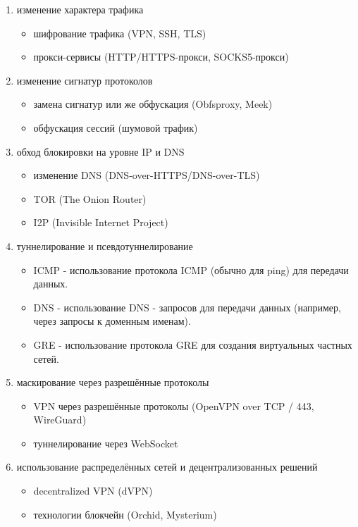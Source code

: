 \documentclass[utf8,14pt,a4paper,oneside,russian]{book}
\begin{document}
\begin{enumerate}
    \item изменение характера трафика
          \begin{itemize}
              \item шифрование трафика (VPN, SSH, TLS)
              \item прокси-сервисы (HTTP/HTTPS-прокси, SOCKS5-прокси)
          \end{itemize}
    \item изменение сигнатур протоколов
          \begin{itemize}
              \item замена сигнатур или же обфускация (Obfsproxy, Meek)
              \item обфускация сессий (шумовой трафик)
          \end{itemize}
    \item обход блокировки на уровне IP и DNS
          \begin{itemize}
              \item изменение DNS (DNS-over-HTTPS/DNS-over-TLS)
              \item TOR (The Onion Router)
              \item I2P (Invisible Internet Project)
          \end{itemize}
    \item туннелирование и псевдотуннелирование
          \begin{itemize}
              \item ICMP - использование протокола ICMP (обычно для ping) для передачи данных.
              \item DNS - использование DNS - запросов для передачи данных (например, через запросы к доменным именам).
              \item GRE - использование протокола GRE для создания виртуальных частных сетей.
          \end{itemize}
    \item маскирование через разрешённые протоколы
          \begin{itemize}
              \item VPN через разрешённые протоколы (OpenVPN over TCP / 443, WireGuard)
              \item туннелирование через WebSocket
          \end{itemize}
    \item  использование распределённых сетей и децентрализованных решений
          \begin{itemize}
              \item decentralized VPN (dVPN)
              \item технологии блокчейн (Orchid, Mysterium)
          \end{itemize}
\end{enumerate}
\end{document}

